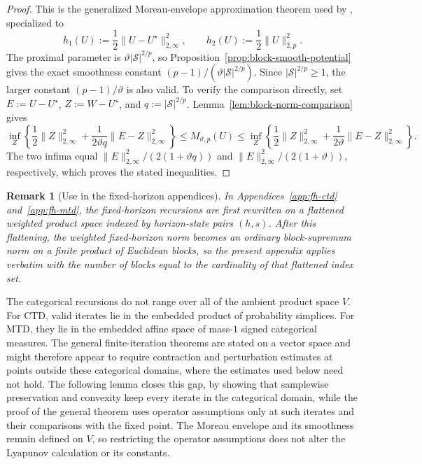 \documentclass{article}
\newtheorem{remark}[theorem]{Remark}
\newcommand{\X}{\mathcal{S}}
\begin{document}
\begin{proof}
This is the generalized Moreau-envelope approximation theorem used by \citet{chen2020finite, chen2024lyapunov}, specialized to
\begin{equation}
h_1(U) := \frac{1}{2}\lVert U-U^\star \rVert_{2,\infty}^2, \qquad h_2(U) := \frac{1}{2}\lVert U \rVert_{2,p}^2.
\end{equation}
The proximal parameter is $\vartheta\lvert\X\rvert^{2/p}$, so Proposition~\ref{prop:block-smooth-potential} gives the exact smoothness constant $(p-1)/(\vartheta\lvert\X\rvert^{2/p})$. Since $\lvert\X\rvert^{2/p}\ge1$, the larger constant $(p-1)/\vartheta$ is also valid. To verify the comparison directly, set $E:=U-U^\star$, $Z:=W-U^\star$, and $q:=\lvert\X\rvert^{2/p}$. Lemma~\ref{lem:block-norm-comparison} gives
\begin{equation}
\inf_Z\left\{\frac12\lVert Z\rVert_{2,\infty}^2+\frac{1}{2\vartheta q}\lVert E-Z\rVert_{2,\infty}^2\right\}\le M_{\vartheta,p}(U)\le\inf_Z\left\{\frac12\lVert Z\rVert_{2,\infty}^2+\frac{1}{2\vartheta}\lVert E-Z\rVert_{2,\infty}^2\right\}.
\end{equation}
The two infima equal $\lVert E\rVert_{2,\infty}^2/(2(1+\vartheta q))$ and $\lVert E\rVert_{2,\infty}^2/(2(1+\vartheta))$, respectively, which proves the stated inequalities.
\end{proof}
\begin{remark}[Use in the fixed-horizon appendices]
In Appendices~\ref{app:fh-ctd} and~\ref{app:fh-mtd}, the fixed-horizon recursions are first rewritten on a flattened weighted product space indexed by horizon-state pairs $(h,s)$. After this flattening, the weighted fixed-horizon norm becomes an ordinary block-supremum norm on a finite product of Euclidean blocks, so the present appendix applies verbatim with the number of blocks equal to the cardinality of that flattened index set.
\end{remark}
The categorical recursions do not range over all of the ambient product space $V$. For CTD, valid iterates lie in the embedded product of probability simplices. For MTD, they lie in the embedded affine space of mass-$1$ signed categorical measures. The general finite-iteration theorems are stated on a vector space and might therefore appear to require contraction and perturbation estimates at points outside these categorical domains, where the estimates used below need not hold. The following lemma closes this gap, by showing that samplewise preservation and convexity keep every iterate in the categorical domain, while the proof of the general theorem uses operator assumptions only at such iterates and their comparisons with the fixed point. The Moreau envelope and its smoothness remain defined on $V$, so restricting the operator assumptions does not alter the Lyapunov calculation or its constants.
\end{document}
